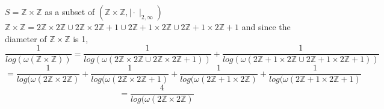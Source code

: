 \begin{example}
{$S=\mathbb{Z} \times \mathbb{Z}$ as a subset of $(\mathbb{Z} \times \mathbb{Z},\mid\cdot\mid_{2,\infty})$\\
	$\mathbb{Z} \times \mathbb{Z} = 2\mathbb{Z} \times 2\mathbb{Z} \cup 2\mathbb{Z} \times 2\mathbb{Z}+1 \cup 2\mathbb{Z}+1 \times 2\mathbb{Z} \cup 2\mathbb{Z}+1 \times 2\mathbb{Z}+1$} and since the diameter of $\mathbb{Z} \times \mathbb{Z}$ is 1, 
	\[\frac{1}{log(\omega(\mathbb{Z} \times \mathbb{Z}))} = \frac{1}{log(\omega(2\mathbb{Z} \times 2\mathbb{Z} \cup 2\mathbb{Z} \times 2\mathbb{Z}+1))} + \frac{1}{log(\omega(2\mathbb{Z}+1 \times 2\mathbb{Z} \cup 2\mathbb{Z}+1 \times 2\mathbb{Z}+1))}\]
	\[=\frac{1}{log(\omega(2\mathbb{Z} \times 2\mathbb{Z})} + \frac{1}{log(\omega(2\mathbb{Z} \times 2\mathbb{Z}+1)} + 
	\frac{1}{log(\omega(2\mathbb{Z}+1 \times 2\mathbb{Z})} +
	\frac{1}{log(\omega(2\mathbb{Z}+1 \times 2\mathbb{Z}+1)} \]
	\[ = \frac{4}{log(\omega(2\mathbb{Z} \times 2\mathbb{Z})}	\]
\end{example}	
